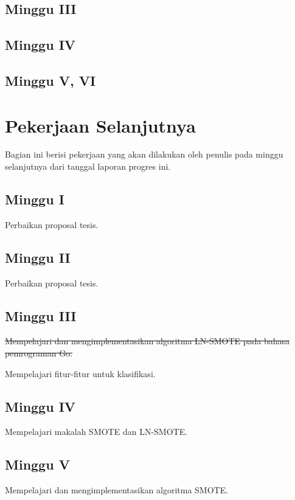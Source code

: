 \subsection{Minggu III}


\subsection{Minggu IV}


\subsection{Minggu V, VI}



\newpage
\section{Pekerjaan Selanjutnya}

Bagian ini berisi pekerjaan yang akan dilakukan oleh penulis pada minggu selanjutnya dari tanggal laporan progres ini.

\subsection{Minggu I}

Perbaikan proposal tesis.

\subsection{Minggu II}

Perbaikan proposal tesis.

\subsection{Minggu III}

\sout{
Mempelajari dan mengimplementasikan algoritma LN-SMOTE pada bahasa pemrograman Go.
}

Mempelajari fitur-fitur untuk klasifikasi.

\subsection{Minggu IV}

Mempelajari makalah SMOTE dan LN-SMOTE.

\subsection{Minggu V}
Mempelajari dan mengimplementasikan algoritma SMOTE.

